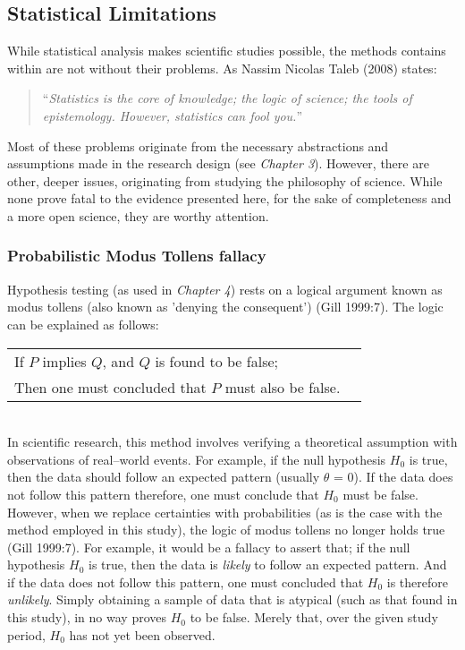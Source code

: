 \begin{spacing}{1.5}
\subsection{Statistical Limitations}
While statistical analysis makes scientific studies possible, the methods contains within are not without their problems. As Nassim Nicolas Taleb (2008) states:

\begin{quote}
``\emph{Statistics is the core of knowledge; the logic of science; the tools of epistemology. However, statistics can fool you.}''
\end{quote}

\noindent Most of these problems originate from the necessary abstractions and assumptions made in the research design (see \emph{Chapter 3}). However, there are other, deeper issues, originating from studying the philosophy of science. While none prove fatal to the evidence presented here, for the sake of completeness and a more open science, they are worthy attention.

\subsubsection{Probabilistic Modus Tollens fallacy}
Hypothesis testing (as used in \emph{Chapter 4}) rests on a logical argument known as modus tollens (also known as 'denying the consequent') (Gill 1999:7). The logic can be explained as follows: \\

\begin{tabular}{ll}
If $P$ implies $Q$, and $Q$ is found to be false;\\
Then one must concluded that $P$ must also be false.\\
\end{tabular}\\

\noindent In scientific research, this method involves verifying a theoretical assumption with observations of real--world events. For example, if the null hypothesis $H_{\mathrm{0}}$ is true, then the data should follow an expected pattern (usually $\theta$ = 0). If the data does not follow this pattern therefore, one must conclude that $H_{\mathrm{0}}$ must be false. \\

\noindent However, when we replace certainties with probabilities (as is the case with the method employed in this study), the logic of modus tollens no longer holds true (Gill 1999:7). For example, it would be a fallacy to assert that; if the null hypothesis $H_{\mathrm{0}}$ is true, then the data is \emph{likely} to follow an expected pattern. And if the data does not follow this pattern, one must concluded that $H_{\mathrm{0}}$ is therefore \emph{unlikely}. Simply obtaining a sample of data that is atypical (such as that found in this study), in no way proves $H_{\mathrm{0}}$ to be false. Merely that, over the given study period, $H_{\mathrm{0}}$ has not yet been observed.\\


\end{spacing}
